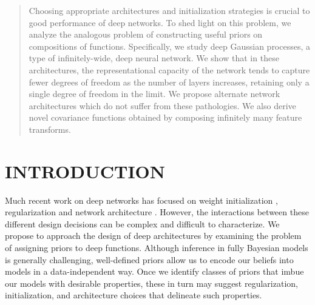 \documentclass[twoside]{article}
\newcommand{\sectiondist}{}
\begin{document}




\begin{abstract}
Choosing appropriate architectures and initialization strategies is crucial to good performance of deep networks.  To shed light on this problem, we analyze the analogous problem of constructing useful priors on compositions of functions.  Specifically, we study deep Gaussian processes, a type of infinitely-wide, deep neural network.  We show that in these architectures, the representational capacity of the network tends to capture fewer degrees of freedom as the number of layers increases, retaining only a single degree of freedom in the limit.  We propose alternate network architectures which do not suffer from these pathologies.  We also derive novel covariance functions obtained by composing infinitely many feature transforms.
\end{abstract}

\section{INTRODUCTION}
\sectiondist

Much recent work on deep networks has focused on weight initialization \citep{martens2010deep}, regularization \citep{lee2007sparse} and network architecture \citep{gens2013learning}.
However, the interactions between these different design decisions can be complex and difficult to characterize. We propose to approach the design of deep architectures by examining the problem of assigning priors to deep functions. Although inference in fully Bayesian models is generally challenging, well-defined priors allow us to encode our beliefs into models in a data-independent way. Once we identify classes of priors that imbue our models with desirable properties, these in turn may suggest regularization, initialization, and architecture choices that delineate such properties.
\end{document}
